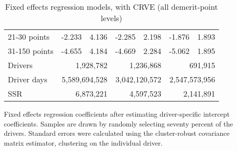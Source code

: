 \begin{table}
\begin{tabular}{l r r r r r r}
21-30 points  & -2.233  &  4.136  & -2.285  &  2.198  & -1.876  &  1.893   \\ 
 
31-150 points  & -4.655  &  4.184  & -4.669  &  2.284  & -5.062  &  1.895   \\ 
 

\hline 
 

Drivers 
 & \multicolumn{2}{r}{1,928,782}  & \multicolumn{2}{r}{1,236,868}  & \multicolumn{2}{r}{691,915}   \\ 
 

Driver days 
 & \multicolumn{2}{r}{5,589,694,528}  & \multicolumn{2}{r}{3,042,120,572}  & \multicolumn{2}{r}{2,547,573,956}   \\ 
 

SSR 
 & \multicolumn{2}{r}{6,873,221}  & \multicolumn{2}{r}{4,597,523}  & \multicolumn{2}{r}{2,141,891}   \\ 
 

\hline 
 
\end{tabular} 
\caption{Fixed effects regression models, with CRVE (all demerit-point levels)} 
Fixed effects regression coefficients after estimating driver-specific intercept coefficients. 
Samples are drawn by randomly selecting seventy percent of the drivers. 
Standard errors were calculated using the cluster-robust covariance matrix estimator, 
clustering on the individual driver. 
\label{tab:FE_regs_CRVE_all_pts} 
\end{table} 
 

